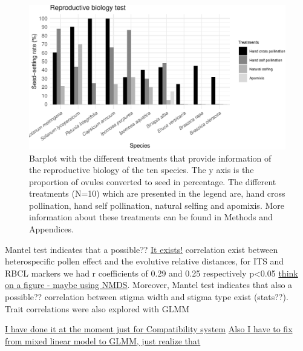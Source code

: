 \documentclass[11pt,a4paper]{article}
\begin{document}
\newpage

\begin{figure}
\centering
\includegraphics{output/figures/unnamed-chunk-2-1.pdf}
\caption{Barplot with the different treatments that provide information
of the reproductive biology of the ten species. The y axis is the
proportion of ovules converted to seed in percentage. The different
treatments (N=10) which are presented in the legend are, hand cross
pollination, hand self pollination, natural selfing and apomixis. More
information about these treatments can be found in Methods and
Appendices.}
\end{figure}

\newpage

Mantel test indicates that a possible?? \href{}{It exists!} correlation
exist between heterospecific pollen effect and the evolutive relative
distances, for ITS and RBCL markers we had r coefficients of 0.29 and
0.25 respectively p\textless{}0.05 \href{}{think on a figure - maybe
using NMDS}. Moreover, Mantel test indicates that also a possible??
correlation between stigma width and stigma type exist (stats??). Trait
correlations were also explored with GLMM

\href{Jose}{I have done it at the moment just for Compatibility system}
\href{Jose}{Also I have to fix from mixed linear model to GLMM, just
realize that}

\newpage
\end{document}
